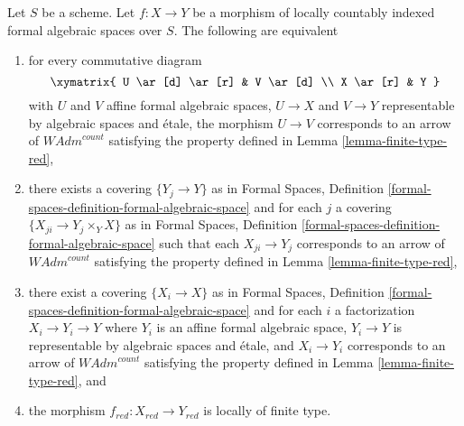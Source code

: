 \begin{lemma}
\label{lemma-finite-type-red-morphisms}
Let $S$ be a scheme. Let $f : X \to Y$ be a morphism of
locally countably indexed formal algebraic spaces over $S$.
The following are equivalent
\begin{enumerate}
\item for every commutative diagram
$$
\xymatrix{
U \ar[d] \ar[r] & V \ar[d] \\
X \ar[r] & Y
}
$$
with $U$ and $V$ affine formal algebraic spaces, $U \to X$ and $V \to Y$
representable by algebraic spaces and \'etale, the morphism $U \to V$
corresponds to an arrow of $\textit{WAdm}^{count}$ satisfying the
property defined in Lemma \ref{lemma-finite-type-red},
\item there exists a covering $\{Y_j \to Y\}$ as in
Formal Spaces,
Definition \ref{formal-spaces-definition-formal-algebraic-space}
and for each $j$
a covering $\{X_{ji} \to Y_j \times_Y X\}$ as in
Formal Spaces,
Definition \ref{formal-spaces-definition-formal-algebraic-space}
such that each $X_{ji} \to Y_j$  corresponds
to an arrow of $\textit{WAdm}^{count}$ satisfying the
property defined in Lemma \ref{lemma-finite-type-red},
\item there exist a covering $\{X_i \to X\}$ as in
Formal Spaces,
Definition \ref{formal-spaces-definition-formal-algebraic-space}
and for each $i$ a factorization $X_i \to Y_i \to Y$ where $Y_i$
is an affine formal algebraic space, $Y_i \to Y$ is representable
by algebraic spaces and \'etale, and $X_i \to Y_i$ corresponds
to an arrow of $\textit{WAdm}^{count}$ satisfying the
property defined in Lemma \ref{lemma-finite-type-red}, and
\item the morphism $f_{red} : X_{red} \to Y_{red}$ is locally of finite type.
\end{enumerate}
\end{lemma}


